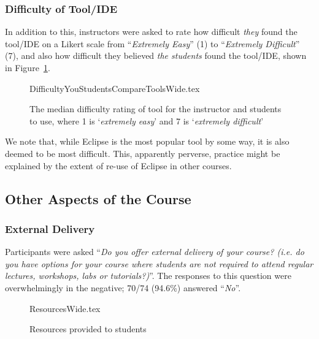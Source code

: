 \documentclass[english]{programming}
\begin{document}
\subsubsection{Difficulty of Tool/IDE}

In addition to this, instructors were asked to rate how difficult
{\emph{they}} found the tool/IDE on a Likert scale from
``{\emph{Extremely Easy}}'' (1) to ``{\emph{Extremely Difficult}}''
(7), and also how difficult they believed {\emph{the students}} found
the tool/IDE, shown in Figure~\ref{fig:toolhard}.

\begin{figure}
\begin{center}
{DifficultyYouStudentsCompareToolsWide.tex}
\end{center}
\caption{The median difficulty rating of tool for the instructor and students to use, where 1 is `{\emph{extremely easy}}' and 7 is `{\emph{extremely difficult}}'  %
\label{fig:toolhard}}
\end{figure}

We note that, while Eclipse is the most popular tool by some way, it
is also deemed to be most difficult. This, apparently perverse,
practice might be explained by the extent of re-use of Eclipse in
other courses.

\subsection{Other Aspects of the Course}

\subsubsection{External Delivery}

Participants were asked ``{\emph{Do you offer external delivery of
your course? (i.e. do you have options for your course where students
are not required to attend regular lectures, workshops, labs or
tutorials?)}}''. The responses to this question were overwhelmingly in
the negative; 70/74 (94.6\%) answered ``{\emph{No}}''.

\begin{figure}
\begin{center}
{ResourcesWide.tex}
\end{center}\vskip-18pt
\caption{Resources provided to students\label{fig:Resources}}
\end{figure}
\end{document}
